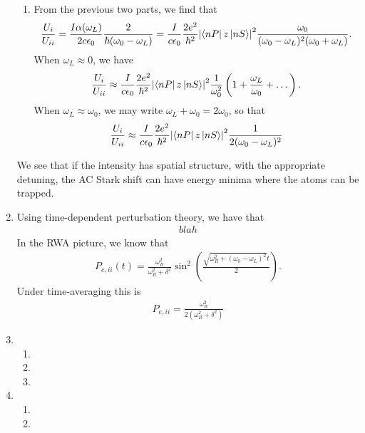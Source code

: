 \documentclass{article}
\theoremstyle{definition}
\newcommand{\al}{\alpha}
\newcommand{\f}[2]{\frac{#1}{#2}}
\newcommand{\lp}{\left(}
\newcommand{\rp}{\right)}
\begin{document}
\begin{enumerate}[label=(\alph*)]
\begin{enumerate}[label=(\roman*)]
		
		\item From the previous two parts, we find that
		\begin{align*}
		\f{U_i}{U_{ii}} = \f{I\al(\omega_L)}{2c\epsilon_0} \f{2}{\hbar (\omega_0 - \omega_L)} = \f{I}{c\epsilon_0 }\f{2e^2}{\hbar^2} \abs{\bra{nP} z \ket{nS}}^2 \f{\omega_0}{(\omega_0 - \omega_L)^2(\omega_0 + \omega_L)}.
		\end{align*}
		When $\omega_L \approx 0$, we have
		\begin{align*}
		\f{U_i}{U_{ii}} \approx \f{I}{c\epsilon_0 }\f{2e^2}{\hbar^2} \abs{\bra{nP} z \ket{nS}}^2 \f{1}{\omega_0^2}\lp 1 + \f{\omega_L}{\omega_0} + \dots \rp.
		\end{align*}
		When $\omega_L \approx \omega_0$, we may write $\omega_L + \omega_0 = 2\omega_0$, so that
		\begin{align*}
		\f{U_i}{U_{ii}} \approx  \f{I}{c\epsilon_0 }\f{2e^2}{\hbar^2} \abs{\bra{nP} z \ket{nS}}^2 \f{1}{2(\omega_0 - \omega_L)^2} 
		\end{align*}
	\end{enumerate}
	We see that if the intensity has spatial structure, with the appropriate detuning, the AC Stark shift can have energy minima where the atoms can be trapped. 
	
	\item Using time-dependent perturbation theory, we have that 
	\begin{align*}
	blah
	\end{align*}
	In the RWA picture, we know that
	\begin{align*}
	P_{e,ii}(t) = \f{\omega_R^2}{\omega^2_R + \delta^2} \sin^2 \lp \f{\sqrt{\omega_R^2 + (\omega_0 - \omega_L)^2} t}{2} \rp.
	\end{align*}
	Under time-averaging this is 
	\begin{align*}
	P_{e,ii} = \f{\omega_R^2}{2(\omega^2_R + \delta^2)} 
	\end{align*}
	
	
	\item 
	
	\begin{enumerate}[label=(\roman*)]
		\item 
		
		\item 
		
		\item 
	\end{enumerate}
	
	\item 
	
	\begin{enumerate}[label=(\roman*)]
		\item 
		
		\item 
		

	\end{enumerate}
\end{enumerate}
\end{document}
